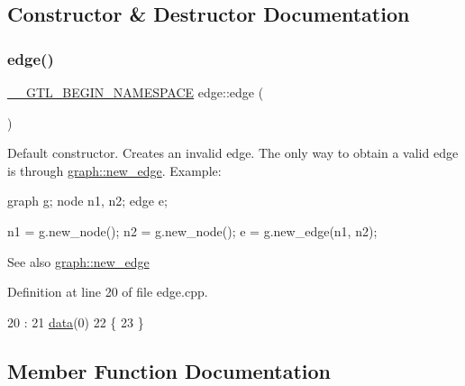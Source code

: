 \subsection{Constructor \& Destructor Documentation}
\mbox{\label{classedge_a746a705d37781374c8d5991abd1f7f58}} 
\subsubsection{\texorpdfstring{edge()}{edge()}}
{\footnotesize\ttfamily \mbox{\hyperlink{_g_t_l_8h_a2d9f24096ac60918452dd51f32b64aa9}{\+\_\+\+\_\+\+G\+T\+L\+\_\+\+B\+E\+G\+I\+N\+\_\+\+N\+A\+M\+E\+S\+P\+A\+CE}} edge\+::edge (\begin{DoxyParamCaption}{ }\end{DoxyParamCaption})}

Default constructor. Creates an invalid edge. The only way to obtain a valid edge is through \mbox{\hyperlink{classgraph_a02a0c3a219f75d68caa408ef339d4a1c}{graph\+::new\+\_\+edge}}. Example\+: 
\begin{DoxyPre}
  graph g;
  node n1, n2;
  edge e;\end{DoxyPre}



\begin{DoxyPre}  n1 = g.new\_node();
  n2 = g.new\_node();
  e = g.new\_edge(n1, n2);
\end{DoxyPre}


\begin{DoxySeeAlso}{See also}
\mbox{\hyperlink{classgraph_a02a0c3a219f75d68caa408ef339d4a1c}{graph\+::new\+\_\+edge}} 
\end{DoxySeeAlso}


Definition at line 20 of file edge.\+cpp.


\begin{DoxyCode}
20            :
21     \mbox{\hyperlink{classedge_a0ebb6dfa28b77f47529085049352b436}{data}}(0)
22 \{
23 \}
\end{DoxyCode}


\subsection{Member Function Documentation}
\mbox{\label{classedge_ad9e615b1a11bbc88aae2b166d377f354}} 
